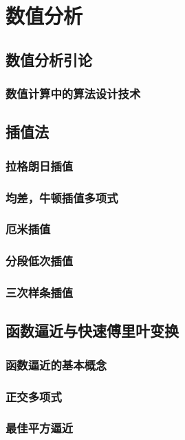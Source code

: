 \part{数值分析}
\chapter{数值分析引论}



\section{数值计算中的算法设计技术}

\chapter{插值法}
\section{拉格朗日插值}
\section{均差，牛顿插值多项式}
\section{厄米插值}
\section{分段低次插值}
\section{三次样条插值}

\chapter{函数逼近与快速傅里叶变换}
\section{函数逼近的基本概念}
\section{正交多项式}
\section{最佳平方逼近}
